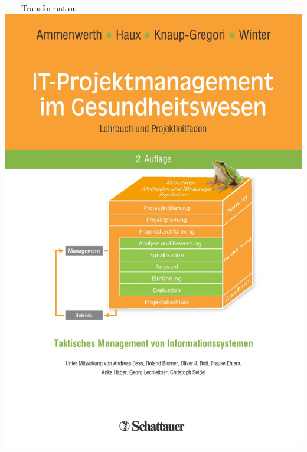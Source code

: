 \documentclass[aspectratio=1610,12pt]{beamer}
\begin{document}
\begin{frame}[plain]{~~~~Transformation}
\centering\includegraphics[height=0.21\textheight,keepaspectratio]{img/book-ob.jpg}

\end{frame}
\end{document}
